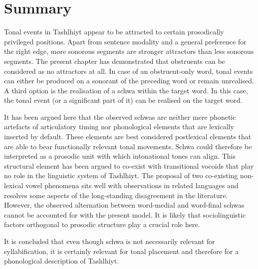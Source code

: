 \section{Summary}\label{sec:6.6}
Tonal events in Tashlhiyt appear to be attracted to certain prosodically privileged positions. Apart from sentence modality and a general preference for the right edge, more sonorous segments are stronger attractors than less sonorous segments. The present chapter has demonstrated that obstruents can be considered as no attractors at all. In case of an obstruent-only word, tonal events can either be produced on a sonorant of the preceding word or remain unrealised. A third option is the realisation of a schwa within the target word. In this case, the tonal event (or a significant part of it) can be realised on the target word. 

It has been argued here that the observed schwas are neither mere phonetic artefacts of articulatory timing nor phonological elements that are lexically inserted by default. These elements are best considered postlexical elements that are able to bear functionally relevant tonal movements. Schwa could therefore be interpreted as a prosodic unit with which intonational tones can align. This structural element has been argued to co-exist with transitional vocoids that play no role in the linguistic system of Tashlhiyt. The proposal of two co-existing non-lexical vowel phenomena sits well with observations in related languages and resolves some aspects of the long-standing disagreement in the literature. However, the observed alternation between word-medial and word-final schwas cannot be accounted for with the present model. It is likely that sociolinguistic factors orthogonal to prosodic structure play a crucial role here. 

It is concluded that even though schwa is not necessarily relevant for syllabification, it is certainly relevant for tonal placement and therefore for a phonological description of Tashlhiyt. 

